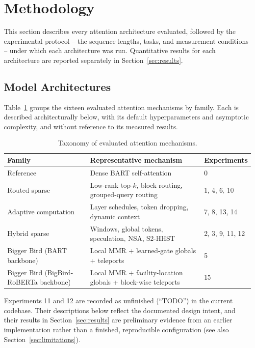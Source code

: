 \documentclass[11pt]{article}
\begin{document}
\section{Methodology}
\label{sec:methodology}

This section describes every attention architecture evaluated, followed by
the experimental protocol -- the sequence lengths, tasks, and measurement
conditions -- under which each architecture was run. Quantitative results for
each architecture are reported separately in Section~\ref{sec:results}.

\subsection{Model Architectures}
\label{sec:architectures}

Table~\ref{tab:taxonomy} groups the sixteen evaluated attention mechanisms by
family. Each is described architecturally below, with its default
hyperparameters and asymptotic complexity, and without reference to its
measured results.

\begin{table}[ht]
  \centering
  \caption{Taxonomy of evaluated attention mechanisms.}
  \label{tab:taxonomy}
  \begin{tabularx}{\textwidth}{@{}l>{\raggedright\arraybackslash}Xl@{}}
    \toprule
    Family & Representative mechanism & Experiments \\
    \midrule
    Reference & Dense BART self-attention & 0 \\
    Routed sparse & Low-rank top-$k$, block routing, grouped-query routing
      & 1, 4, 6, 10 \\
    Adaptive computation & Layer schedules, token dropping, dynamic context
      & 7, 8, 13, 14 \\
    Hybrid sparse & Windows, global tokens, speculation, NSA, S2-HHST
      & 2, 3, 9, 11, 12 \\
    Bigger Bird (BART backbone) & Local MMR + learned-gate globals + teleports
      & 5 \\
    Bigger Bird (BigBird-RoBERTa backbone) & Local MMR + facility-location
      globals + block-wise teleports & 15 \\
    \bottomrule
  \end{tabularx}
\end{table}

Experiments 11 and 12 are recorded as unfinished (``TODO'') in the current
codebase. Their descriptions below reflect the documented design intent, and
their results in Section~\ref{sec:results} are preliminary evidence from an
earlier implementation rather than a finished, reproducible configuration
(see also Section~\ref{sec:limitations}).
\end{document}
